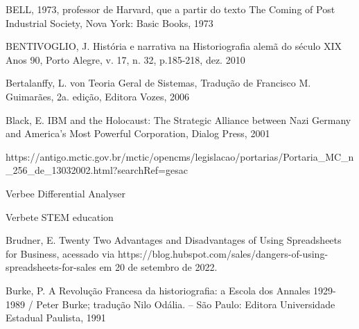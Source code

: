 \begin{flushleft}
[BELL, 1973]  BELL, 1973, professor de Harvard, que a partir do texto The Coming of Post Industrial Society, Nova York: Basic Books, 1973
\end{flushleft}


\begin{flushleft}
[BENTIVOGLIO, 2010] BENTIVOGLIO, J. História e narrativa na Historiografia alemã do século XIX Anos 90, Porto Alegre, v. 17, n. 32, p.185-218, dez. 2010
\end{flushleft}


\begin{flushleft}
[BERTALANFFY, 1968] Bertalanffy, L. von Teoria Geral de Sistemas, Tradução de Francisco M. Guimarães, 2a. edição, Editora Vozes, 2006
\end{flushleft}


\begin{flushleft}
[BLACK, 2001] Black, E. IBM and the Holocaust: The Strategic Alliance between Nazi Germany and America's Most Powerful Corporation, Dialog Press, 2001
\end{flushleft}


\begin{flushleft}
[BRASIL, 2002] https://antigo.mctic.gov.br/mctic/opencms/legislacao/portarias/Portaria\_MC\_n\_256\_de\_13032002.html?searchRef=gesac
\end{flushleft}


\begin{flushleft}
[BRITANNICA, 2022] Verbee Differential Analyser
\end{flushleft}


\begin{flushleft}
[BRITANNICA, 2022a] Verbete STEM education
\end{flushleft}


\begin{flushleft}
[BRUDNER, 2022] Brudner, E. Twenty Two Advantages and Disadvantages of Using Spreadsheets for Business, acessado via https://blog.hubspot.com/sales/dangers-of-using-spreadsheets-for-sales em 20 de setembro de 2022.
\end{flushleft}


\begin{flushleft}
[BURKE, 1991] Burke, P. A Revolução Francesa da historiografia: a Escola dos Annales 1929-1989 / Peter Burke; tradução Nilo Odália. – São Paulo: Editora Universidade Estadual Paulista, 1991
\end{flushleft}


